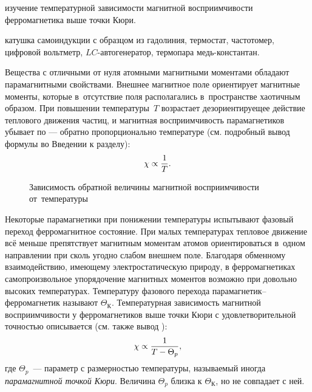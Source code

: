 
\begin{lab:aim}
изучение температурной зависимости магнитной восприимчивости ферромагнетика
выше точки Кюри.
\end{lab:aim}

\begin{lab:equipment}
катушка самоиндукции с образцом из гадолиния, термостат, частотомер,
цифровой вольтметр, $LC$-автогенератор, термопара медь-константан.
\end{lab:equipment}

Вещества с отличными от нуля атомными магнитными моментами обладают
парамагнитными свойствами. Внешнее магнитное поле ориентирует магнитные моменты,
которые в~отсутствие поля располагались в~пространстве хаотичным образом.
При повышении температуры~$T$ возрастает дезориентируещее действие теплового
движения частиц, и магнитная восприимчивость парамагнетиков убывает
по  --- обратно пропорционально температуре (см.
подробный вывод формулы  во Введении к разделу):
\begin{equation}%
	\chi\propto \frac{1}{T}.
	\eqmark{curi}
\end{equation}

\begin{wrapfigure}{r}{0.4\textwidth}
    \caption{Зависимость обратной величины магнитной восприимчивости
от~температуры}
\end{wrapfigure}

Некоторые парамагнетики при понижении температуры испытывают
фазовый переход ферромагнитное состояние. При малых температурах
тепловое движение всё меньше препятствует магнитным моментам атомов
ориентироваться в~одном направлении при сколь угодно слабом внешнем поле.
Благодаря обменному взаимодействию, имеющему электростатическую природу,
в ферромагнетиках самопроизвольное упорядочение магнитных моментов
возможно при довольно высоких температурах. Температуру фазового перехода
парамагнетик--ферромагнетик называют  $\Theta_К$.
Температурная зависимость магнитной восприимчивости у ферромагнетиков
выше точки Кюри с удовлетворительной точностью
описывается  (см. также вывод
):
\begin{equation}%
    \chi\propto \frac{1}{T-\Theta_p},
    \eqmark{curi-veis}
\end{equation}
где $\Theta_p$~--- параметр с размерностью температуры, называемый
иногда \emph{парамагнитной точкой Кюри}. Величина $\Theta_p$ близка к
$\Theta_К$, но не совпадает с ней.

